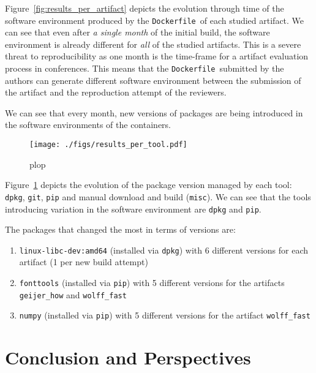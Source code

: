 \documentclass[sigconf,natbib=false]{acmart}
\newcommand{\df}{\texttt{Dockerfile}}
\begin{document}
Figure~\ref{fig:results_per_artifact} depicts the evolution through time of the software environment produced by the \df\ of each studied artifact.
We can see that even after \emph{a single month} of the initial build, the software environment is already different for \emph{all} of the studied artifacts.
This is a severe threat to reproducibility as one month is the time-frame for a artifact evaluation process in conferences.
This means that the \df\ submitted by the authors can generate different software environment between the submission of the artifact and the reproduction attempt of the reviewers.


We can see that every month, new versions of packages are being introduced in the software environments of the containers.



\begin{figure}
  \centering
  \texttt{[image: ./figs/results\_per\_tool.pdf]}
  \caption{
    plop
  }\label{fig:results_per_tool}
\end{figure}

Figure~\ref{fig:results_per_tool} depicts the evolution of the package version managed by each tool: \texttt{dpkg}, \texttt{git}, \texttt{pip} and manual download and build (\texttt{misc}).
We can see that the tools introducing variation in the software environment are \texttt{dpkg} and \texttt{pip}.

The packages that changed the most in terms of versions are:
\begin{enumerate}
\item \texttt{linux-libc-dev:amd64} (installed via \texttt{dpkg}) with 6 different versions for each artifact (1 per new build attempt)
\item \texttt{fonttools} (installed via \texttt{pip}) with 5 different versions for the artifacts \texttt{geijer\_how} and \texttt{wolff\_fast}
\item \texttt{numpy} (installed via \texttt{pip}) with 5 different versions for the artifact \texttt{wolff\_fast}
\end{enumerate}


\section{Conclusion and Perspectives}\label{sec:conclusion}
\end{document}
